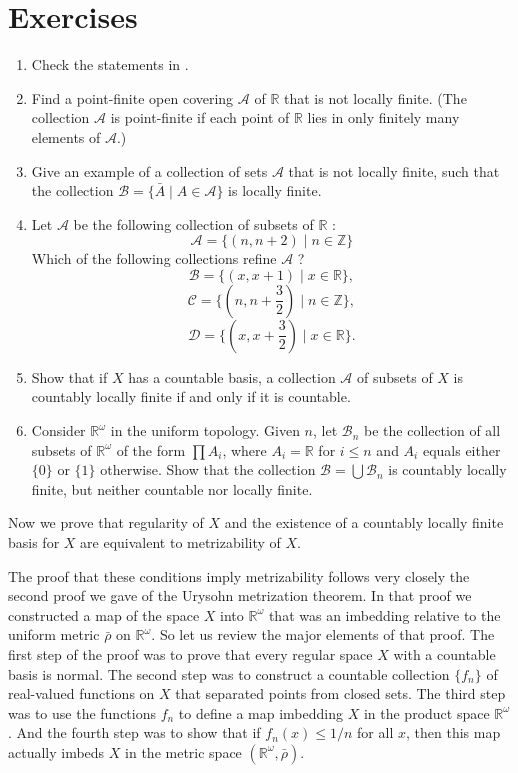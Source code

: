 \section*{Exercises}
\begin{enumerate}[itemsep=0.4em, parsep=0pt, topsep=0pt, partopsep=0pt, leftmargin=*, label=\arabic*., ref=\arabic*]
\item Check the statements in .
\item Find a point-finite open covering \(\mathcal{A}\) of \(\mathbb{R}\) that is not locally finite. (The collection \(\mathcal{A}\) is point-finite if each point of \(\mathbb{R}\) lies in only finitely many elements of \(\mathcal{A}\).)
\item Give an example of a collection of sets \(\mathcal{A}\) that is not locally finite, such that the collection \(\mathcal{B} = \{ \bar{A} \mid A \in \mathcal{A}\}\) is locally finite.
\item Let \(\mathcal{A}\) be the following collection of subsets of \(\mathbb{R}\) : \[ \mathcal{A} = \{ ({n,n + 2}) \mid n \in \mathbb{Z}\} \] Which of the following collections refine \(\mathcal{A}\) ? \[ \mathcal{B} = \{ ({x,x + 1}) \mid x \in \mathbb{R}\}, \] \[ \mathcal{C} = \{ {({n,n + \frac{3}{2}}) \mid n \in \mathbb{Z}}\}, \] \[ \mathcal{D} = \{ {({x,x + \frac{3}{2}}) \mid x \in \mathbb{R}}\}. \]
\item Show that if \(X\) has a countable basis, a collection \(\mathcal{A}\) of subsets of \(X\) is countably locally finite if and only if it is countable.
\item Consider \(\mathbb{R}^{\omega }\) in the uniform topology. Given \(n\), let \(\mathcal{B}_{n}\) be the collection of all subsets of \(\mathbb{R}^{\omega }\) of the form \(\prod {A}_{i}\), where \(A_{i} = \mathbb{R}\) for \(i \leq n\) and \(A_{i}\) equals either \(\{ 0\}\) or \(\{ 1\}\) otherwise. Show that the collection \(\mathcal{B} = \bigcup {\mathcal{B}}_{n}\) is countably locally finite, but neither countable nor locally finite.
\end{enumerate}

Now we prove that regularity of \(X\) and the existence of a countably locally finite basis for \(X\) are equivalent to metrizability of \(X\).

The proof that these conditions imply metrizability follows very closely the second proof we gave of the Urysohn metrization theorem. In that proof we constructed a map of the space \(X\) into \(\mathbb{R}^{\omega }\) that was an imbedding relative to the uniform metric \(\bar{\rho }\) on \(\mathbb{R}^{\omega }\). So let us review the major elements of that proof. The first step of the proof was to prove that every regular space \(X\) with a countable basis is normal. The second step was to construct a countable collection \(\{ f_{n}\}\) of real-valued functions on \(X\) that separated points from closed sets. The third step was to use the functions \(f_{n}\) to define a map imbedding \(X\) in the product space \(\mathbb{R}^{\omega }\). And the fourth step was to show that if \(f_{n}(x) \leq 1/n\) for all \(x\), then this map actually imbeds \(X\) in the metric space \(({\mathbb{R}^{\omega },\bar{\rho }})\).

